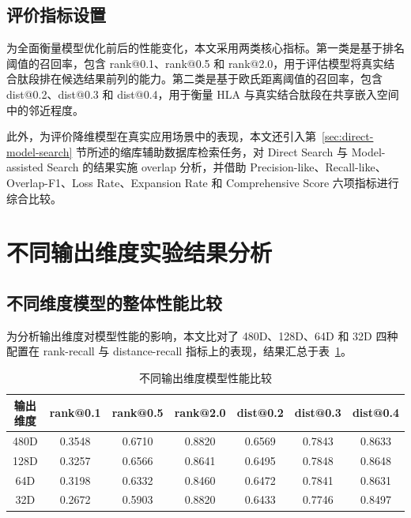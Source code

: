 \subsection{评价指标设置}

为全面衡量模型优化前后的性能变化，本文采用两类核心指标。第一类是基于排名阈值的召回率，包含 rank@0.1、rank@0.5 和 rank@2.0，用于评估模型将真实结合肽段排在候选结果前列的能力。第二类是基于欧氏距离阈值的召回率，包含 dist@0.2、dist@0.3 和 dist@0.4，用于衡量 HLA 与真实结合肽段在共享嵌入空间中的邻近程度。

此外，为评价降维模型在真实应用场景中的表现，本文还引入第~\ref{sec:direct-model-search} 节所述的缩库辅助数据库检索任务，对 Direct Search 与 Model-assisted Search 的结果实施 overlap 分析，并借助 Precision-like、Recall-like、Overlap-F1、Loss Rate、Expansion Rate 和 Comprehensive Score 六项指标进行综合比较。

\section{不同输出维度实验结果分析}


\subsection{不同维度模型的整体性能比较}

为分析输出维度对模型性能的影响，本文比对了 480D、128D、64D 和 32D 四种配置在 rank-recall 与 distance-recall 指标上的表现，结果汇总于表~\ref{tab:dimension-performance}。

\begin{table}[htbp]
    \centering
    \caption{不同输出维度模型性能比较}
    \label{tab:dimension-performance}
    \begin{tabular}{ccccccc}
        \toprule
        输出维度 & rank@0.1 & rank@0.5 & rank@2.0 & dist@0.2 & dist@0.3 & dist@0.4 \\
        \midrule
        480D & 0.3548 & 0.6710 & 0.8820 & 0.6569 & 0.7843 & 0.8633 \\
        128D & 0.3257 & 0.6566 & 0.8641 & 0.6495 & 0.7848 & 0.8648 \\
        64D  & 0.3198 & 0.6332 & 0.8460 & 0.6472 & 0.7841 & 0.8631 \\
        32D  & 0.2672 & 0.5903 & 0.8820 & 0.6433 & 0.7746 & 0.8497 \\
        \bottomrule
    \end{tabular}
\end{table}

